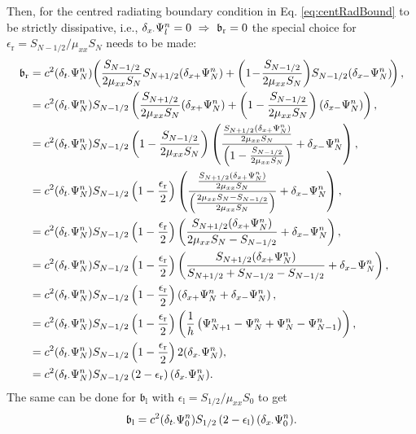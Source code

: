 Then, for the centred radiating boundary condition in Eq. \eqref{eq:centRadBound} to be strictly dissipative, i.e., $\dxd \Psiln = 0 \ \Rightarrow \ \b_\text{r} = 0$ the special choice for $\epsilon_\text{r} = S_{N-1/2} / \mu_{xx}S_N$ needs to be made:
\begin{equation}
    \begin{aligned}
        \mathfrak{b}_\text{r} &= c^2 (\delta_{t\cdot}\Psi_N^n)\!\left(\frac{S_{N-1/2}}{2\mu_{xx}S_N}S_{N+1/2}(\delta_{x+}\Psi_N^n)+\left(1\!-\!\frac{S_{N-1/2}}{2\mu_{xx}S_N}\right)\!S_{N-1/2}(\delta_{x-}\Psi_N^n)\!\right),\\
        &= c^2 (\delta_{t\cdot}\Psi_N^n)S_{N-1/2}\left(\frac{S_{N+1/2}}{2\mu_{xx}S_N}(\delta_{x+}\Psi_N^n)+\left(1-\frac{S_{N-1/2}}{2\mu_{xx}S_N}\right)(\delta_{x-}\Psi_N^n)\right),\\
        &=c^2 (\delta_{t\cdot}\Psi_N^n)S_{N-1/2}\left(1-\frac{S_{N-1/2}}{2\mu_{xx}S_N}\right)\left(\frac{\frac{S_{N+1/2}(\delta_{x+}\Psi_N^n)}{2\mu_{xx}S_N}}{\left(1-\frac{S_{N-1/2}}{2\mu_{xx}S_N}\right)}+\delta_{x-}\Psi_N^n\right),\\
        &=c^2 (\delta_{t\cdot}\Psi_N^n)S_{N-1/2}\left(1-\frac{\epsilon_\text{r}}{2}\right)\left(\frac{\frac{S_{N+1/2}(\delta_{x+}\Psi_N^n)}{2\mu_{xx}S_N}}{\left(\frac{2\mu_{xx}S_N - S_{N-1/2}}{2\mu_{xx}S_N}\right)}+\delta_{x-}\Psi_N^n\right),\\
        &=c^2 (\delta_{t\cdot}\Psi_N^n)S_{N-1/2}\left(1-\frac{\epsilon_\text{r}}{2}\right)\left(\frac{S_{N+1/2}(\delta_{x+}\Psi_N^n)}{2\mu_{xx}S_N - S_{N-1/2}}+\delta_{x-}\Psi_N^n\right),\\
        &=c^2 (\delta_{t\cdot}\Psi_N^n)S_{N-1/2}\left(1-\frac{\epsilon_\text{r}}{2}\right)\left(\frac{S_{N+1/2}(\delta_{x+}\Psi_N^n)}{S_{N+1/2} + S_{N-1/2} - S_{N-1/2}}+\delta_{x-}\Psi_N^n\right),\\
        &=c^2 (\delta_{t\cdot}\Psi_N^n)S_{N-1/2}\left(1-\frac{\epsilon_\text{r}}{2}\right)\left(\delta_{x+}\Psi_N^n+\delta_{x-}\Psi_N^n\right),\\
        &=c^2 (\delta_{t\cdot}\Psi_N^n)S_{N-1/2}\left(1-\frac{\epsilon_\text{r}}{2}\right)\left(\frac{1}{h}\left(\Psi_{N+1}^n - \Psi_N^n + \Psi_N^n - \Psi_{N-1}^n\right)\right),\\
&= c^2 (\delta_{t\cdot}\Psi_N^n)S_{N-1/2}\left(1-\frac{\epsilon_\text{r}}{2}\right)2(\delta_{x\cdot}\Psi_N^n),\\
&= c^2 (\delta_{t\cdot}\Psi_N^n)S_{N-1/2}\left(2-\epsilon_\text{r}\right)(\delta_{x\cdot}\Psi_N^n).
    \end{aligned}
\end{equation}
The same can be done for $\mathfrak{b}_\text{l}$ with $\epsilon_\text{l} = S_{1/2}/\mu_{xx}S_0$ to get
\begin{equation}
    \mathfrak{b}_\text{l} = c^2(\delta_{t\cdot}\Psi_0^n)S_{1/2}\left(2-\epsilon_\text{l}\right)(\delta_{x\cdot}\Psi_0^n).
\end{equation}


